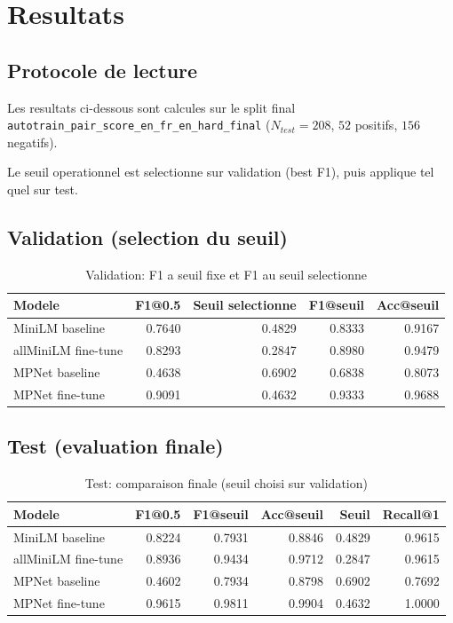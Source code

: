 \chapter{Resultats}

\section{Protocole de lecture}
Les resultats ci-dessous sont calcules sur le split final
\texttt{autotrain\_pair\_score\_en\_fr\_en\_hard\_final}
(\(N_{test}=208\), \(52\) positifs, \(156\) negatifs).

Le seuil operationnel est selectionne sur validation (best F1), puis applique tel quel sur test.

\section{Validation (selection du seuil)}
\begin{table}[H]
  \centering
  \caption{Validation: F1 a seuil fixe et F1 au seuil selectionne}
  \begin{tabular}{lrrrr}
    \toprule
    Modele & F1@0.5 & Seuil selectionne & F1@seuil & Acc@seuil \\
    \midrule
    MiniLM baseline & 0.7640 & 0.4829 & 0.8333 & 0.9167 \\
    allMiniLM fine-tune & 0.8293 & 0.2847 & 0.8980 & 0.9479 \\
    MPNet baseline & 0.4638 & 0.6902 & 0.6838 & 0.8073 \\
    MPNet fine-tune & 0.9091 & 0.4632 & 0.9333 & 0.9688 \\
    \bottomrule
  \end{tabular}
\end{table}

\section{Test (evaluation finale)}
\begin{table}[H]
  \centering
  \caption{Test: comparaison finale (seuil choisi sur validation)}
  \begin{tabular}{lrrrrr}
    \toprule
    Modele & F1@0.5 & F1@seuil & Acc@seuil & Seuil & Recall@1 \\
    \midrule
    MiniLM baseline & 0.8224 & 0.7931 & 0.8846 & 0.4829 & 0.9615 \\
    allMiniLM fine-tune & 0.8936 & 0.9434 & 0.9712 & 0.2847 & 0.9615 \\
    MPNet baseline & 0.4602 & 0.7934 & 0.8798 & 0.6902 & 0.7692 \\
    MPNet fine-tune & 0.9615 & 0.9811 & 0.9904 & 0.4632 & 1.0000 \\
    \bottomrule
  \end{tabular}
\end{table}

